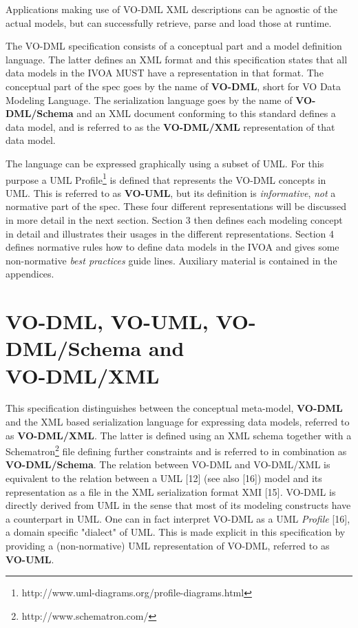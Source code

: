 \documentclass[10pt,a4paper]{ivoa}
\begin{document}
Applications making use of VO-DML XML descriptions can be agnostic of
the actual models, but can successfully retrieve, parse and load those
at runtime.

The VO-DML specification consists of a conceptual part and a model
definition language. The latter defines an XML format and this
specification states that all data models in the IVOA MUST have a
representation in that format. The conceptual part of the spec goes by
the name of \textbf{VO-DML}, short for VO Data Modeling Language. The
serialization language goes by the name of \textbf{VO-DML/Schema} and an
XML document conforming to this standard defines a data model, and is
referred to as the \textbf{VO-DML/XML} representation of that data
model.

The language can be expressed graphically using a subset of UML. For
this purpose a UML Profile\footnote{http://www.uml-diagrams.org/profile-diagrams.html}
is defined that represents the VO-DML concepts in UML. This is referred
to as \textbf{VO-UML}, but its definition is \emph{informative},
\emph{not} a normative part of the spec. These four different
representations will be discussed in more detail in the next section.
Section 3 then defines each modeling concept in detail and illustrates
their usages in the different representations. Section 4 defines
normative rules how to define data models in the IVOA and gives some
non-normative \emph{best practices} guide lines. Auxiliary material is
contained in the appendices.

\hypertarget{vo-dml-vo-uml-vo-dmlschema-and-vo-dmlxml}{%
\section{\texorpdfstring{VO-DML, VO-UML, VO-DML/Schema and\\
VO-DML/XML}{VO-DML, VO-UML, VO-DML/Schema and VO-DML/XML}}\label{vo-dml-vo-uml-vo-dmlschema-and-vo-dmlxml}}

This specification distinguishes between the conceptual meta-model,
\textbf{VO-DML} and the XML based serialization language for expressing
data models, referred to as \textbf{VO-DML/XML}. The latter is defined
using an XML schema together with a Schematron\footnote{http://www.schematron.com/}
file defining further constraints and is referred to in combination as
\textbf{VO-DML/Schema}. The relation between VO-DML and VO-DML/XML is
equivalent to the relation between a UML {[}12{]} (see also {[}16{]})
model and its representation as a file in the XML serialization format
XMI {[}15{]}\emph{.} VO-DML is directly derived from UML in the sense
that most of its modeling constructs have a counterpart in UML. One can
in fact interpret VO-DML as a UML \emph{Profile} {[}16{]}, a domain
specific "dialect" of UML. This is made explicit in this specification
by providing a (non-normative) UML representation of VO-DML, referred to
as \textbf{VO-UML}.
\end{document}
